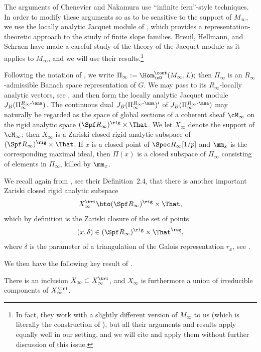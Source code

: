 The arguments of Chenevier and Nakamura use ``infinite fern''-style
techniques. In order to modify these arguments so as to be sensitive
to the support of $M_{\infty}$, we use the locally analytic Jacquet
module of \cite{Jacquet-one}, which provides a representation-theoretic
approach to the study of finite slope families. Breuil, Hellmann,
and Schraen \cite{BHS} have made a careful study of the theory
of the Jacquet module as it applies to $M_{\infty}$, and we will
use their results.\footnote{In fact, they work with a slightly
different version of $M_{\infty}$ to us (which is literally
the construction of \cite{six-authors}), but all their arguments
and results apply equally well in our setting, and we will cite
and apply them without further discussion of this issue.}

Following the notation of \cite{BHS},
we write $\Pi_{\infty} := \Hom^{\cont}_{\cO}
(M_{\infty}, L);$ then $\Pi_{\infty}$ is an
$R_{\infty}$-admissible Banach space representation of $G$.
We may pass to its $R_{\infty}$-locally analytic vectors, see \cite[\S 3.1]{BHS},
and then form the locally analytic Jacquet module
$J_B(\Pi_{\infty}^{R_{\infty}\textup{-}\ana})$.
The continuous dual
$J_B(\Pi_{\infty}^{R_{\infty}\textup{-}\ana})'$
of $J_B(\Pi_{\infty}^{R_{\infty}\textup{-}\ana})$
may naturally be
regarded as the space of global sections of a coherent sheaf
$\cM_{\infty}$
on the rigid analytic
space $(\Spf R_{\infty})^{\rig} \times \That$.
We let $X_{\infty}$ denote the support of $\cM_{\infty}$;
then $X_{\infty}$ is a
Zariski closed rigid analytic subspace of
$ (\Spf R_{\infty})^{\rig}\times \That$. If $x$ is a closed point of $\Spec R_{\infty}[1/p]$ and
$\mm_x$ is the corresponding maximal ideal,
then $\Pi(x)$ is a closed subspace of $\Pi_{\infty}$ consisting of elements in $\Pi_{\infty}$, killed
by $\mm_x$.

We recall again from \cite{BHS}, see their Definition~2.4,
that there is another important
Zariski closed rigid analytic subspace
\[
X^{\tri}_{\infty} \hto
(\Spf R_{\infty})^{\rig}\times \That,
\]
which by definition is the Zariski closure of the
set of points
\[
(x,\delta) \in
(\Spf R_{\infty})^{\rig}\times \That^{\reg},
\]
where $\delta$ is the parameter of a triangulation of the Galois
representation $r_x$, see \hbox{\cite[\S 2.2]{BHS}}.

We then have the following key result of \cite{BHS}.

\begin{thm}
\label{thm:BHS main}
There is an inclusion
$X_{\infty} \subset X^{\tri}_{\infty}$,
and $X_{\infty}$ is furthermore a union of irreducible
components of $X^{\tri}_{\infty}$.
\end{thm}

